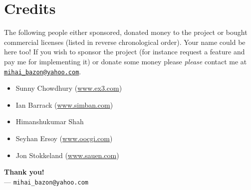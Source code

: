 \documentclass[a4paper,10pt]{article}
\begin{document}
\section{Credits}

The following people either sponsored, donated money to the project or bought
commercial licenses (listed in reverse chronological order).  Your name could
be here too!  If you wish to sponsor the project (for instance request a
feature and pay me for implementing it) or donate some money please
\emph{please} contact me at \texttt{\href{mailto:mihai\_bazon@yahoo.com}{mihai\_bazon@yahoo.com}}.

\begin{itemize}

  \item Sunny Chowdhury ({\href{http://www.ex3.com}{www.ex3.com}})

  \item Ian Barrack ({\href{http://www.simban.com}{www.simban.com}})

  \item Himanshukumar Shah

  \item Seyhan Ersoy ({\href{http://www.oocgi.com}{www.oocgi.com}})

  \item Jon Stokkeland ({\href{http://www.sauen.com}{www.sauen.com}})

\end{itemize}

\begin{flushright}
\textbf{Thank you!}\\
--- \texttt{mihai\_bazon@yahoo.com}
\end{flushright}
\end{document}
